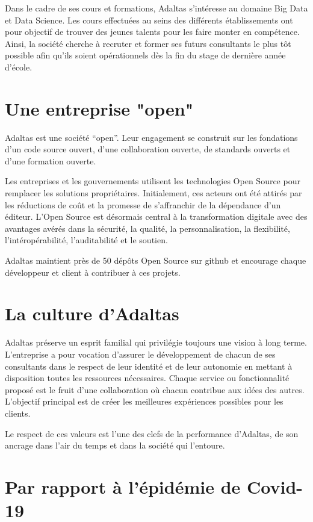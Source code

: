 \documentclass[12pt, french]{report}
\begin{document}
Dans le cadre de ses cours et formations, Adaltas s'intéresse au domaine Big Data et Data Science. Les cours effectuées au seins des différents établissements ont pour objectif de trouver des jeunes talents pour les faire monter en compétence. Ainsi, la société cherche à recruter et former ses futurs consultants le plus tôt possible afin qu'ils soient opérationnels dès la fin du stage de dernière année d'école.

\section{Une entreprise "open"}

Adaltas est une société “open”. Leur engagement se construit sur les fondations d’un code source ouvert, d’une collaboration ouverte, de standards ouverts et d’une formation ouverte.

Les entreprises et les gouvernements utilisent les technologies Open Source pour remplacer les solutions propriétaires. Initialement, ces acteurs ont été attirés par les réductions de coût et la promesse de s’affranchir de la dépendance d’un éditeur. L’Open Source est désormais central à la transformation digitale avec des avantages avérés dans la sécurité, la qualité, la personnalisation, la flexibilité, l’intéropérabilité, l’auditabilité et le soutien.

Adaltas maintient près de 50 dépôts Open Source sur \gls{github} et encourage chaque développeur et client à contribuer à ces projets.

\section{La culture d'Adaltas}

Adaltas préserve un esprit familial qui privilégie toujours une vision à long terme. L'entreprise a pour vocation d’assurer le développement de chacun de ses consultants dans le respect de leur identité et de leur autonomie en mettant à disposition toutes les ressources nécessaires. Chaque service ou fonctionnalité proposé est le fruit d’une collaboration où chacun contribue aux idées des autres. L'objectif principal est de créer les meilleures expériences possibles pour les clients.

Le respect de ces valeurs est l’une des clefs de la performance d'Adaltas, de son ancrage dans l’air du temps et dans la société qui l'entoure.

\section{Par rapport à l'épidémie de Covid-19}
\end{document}

